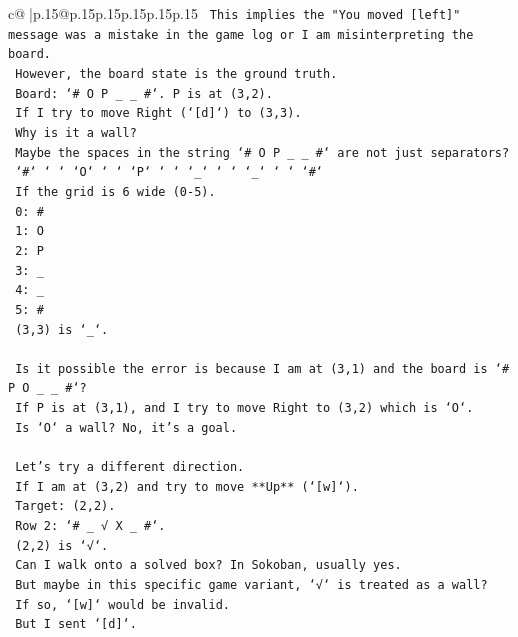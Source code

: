 \documentclass{article}
\begin{document}
{\begin{supertabular}{c@{$\;$}|p{.15\linewidth}@{}p{.15\linewidth}p{.15\linewidth}p{.15\linewidth}p{.15\linewidth}p{.15\linewidth}}
{{{\texttt{    This implies the "You moved {[}left{]}" message was a mistake in the game log or I am misinterpreting the board.} \\
\texttt{    However, the board state is the ground truth.} \\
\texttt{    Board: `\# O P \_ \_ \#`. P is at (3,2).} \\
\texttt{    If I try to move Right (`{[}d{]}`) to (3,3).} \\
\texttt{    Why is it a wall?} \\
\texttt{    Maybe the spaces in the string `\# O P \_ \_ \#` are not just separators?} \\
\texttt{    `\#` ` ` `O` ` ` `P` ` ` `\_` ` ` `\_` ` ` `\#`} \\
\texttt{    If the grid is 6 wide (0{-}5).} \\
\texttt{    0: \#} \\
\texttt{    1: O} \\
\texttt{    2: P} \\
\texttt{    3: \_} \\
\texttt{    4: \_} \\
\texttt{    5: \#} \\
\texttt{    (3,3) is `\_`.} \\
\\ 
\texttt{    Is it possible the error is because I am at (3,1) and the board is `\# P O \_ \_ \#`?} \\
\texttt{    If P is at (3,1), and I try to move Right to (3,2) which is `O`.} \\
\texttt{    Is `O` a wall? No, it's a goal.} \\
\\ 
\texttt{    Let's try a different direction.} \\
\texttt{    If I am at (3,2) and try to move **Up** (`{[}w{]}`).} \\
\texttt{    Target: (2,2).} \\
\texttt{    Row 2: `\# \_ √ X \_ \#`.} \\
\texttt{    (2,2) is `√`.} \\
\texttt{    Can I walk onto a solved box? In Sokoban, usually yes.} \\
\texttt{    But maybe in this specific game variant, `√` is treated as a wall?} \\
\texttt{    If so, `{[}w{]}` would be invalid.} \\
\texttt{    But I sent `{[}d{]}`.} \\
\\ 
}}}
\end{supertabular}}
\end{document}
